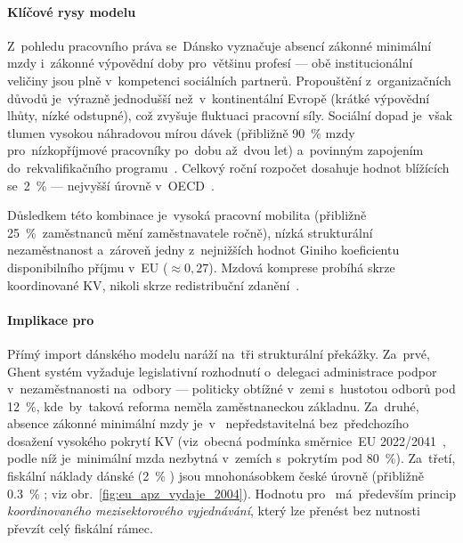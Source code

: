 \paragraph{Klíčové rysy modelu}\label{par:dk_rysy}

Z~pohledu pracovního práva se~Dánsko vyznačuje absencí zákonné minimální mzdy
i~zákonné výpovědní doby pro~většinu profesí --- obě institucionální veličiny
jsou plně v~kompetenci sociálních partnerů. Propouštění z~organizačních důvodů
je~výrazně jednodušší než~v~kontinentální Evropě (krátké výpovědní lhůty,
nízké odstupné), což zvyšuje fluktuaci pracovní síly. Sociální dopad je~však
tlumen vysokou náhradovou mírou dávek (přibližně \SI{90}{\percent} mzdy
pro~nízkopříjmové pracovníky po~dobu až~dvou let) a~povinným zapojením
do~rekvalifikačního programu~\cite{OECD_GoodJobsForAll_2018}\cite{Petricek_PS1_FlexicurityDK_2019}.
Celkový roční rozpočet  dosahuje hodnot blížících se~\SI{2}{\percent}
 --- nejvyšší úrovně v~\acs{OECD}~\cite{OECD_GoodJobsForAll_2018}.

Důsledkem této kombinace je~vysoká pracovní mobilita (přibližně 25~\%~zaměstnanců
mění zaměstnavatele ročně), nízká strukturální nezaměstnanost
a~zároveň jedny z~nejnižších hodnot Giniho koeficientu disponibilního příjmu
v~\acs{EU} ($\approx 0{,}27$). Mzdová komprese probíhá skrze koordinované
\acs{KV}, nikoli skrze redistribuční zdanění~\cite{Petricek_PS1_FlexicurityDK_2019}\cite{Hala_SystemySocialnihoDialogu2013}.

\paragraph{Implikace pro~}\label{par:dk_implikace}

Přímý import dánského modelu naráží na~tři strukturální překážky. Za~prvé,
\acs{Ghent} systém vyžaduje legislativní rozhodnutí o~delegaci administrace
podpor v~nezaměstnanosti na~odbory --- politicky obtížné v~zemi s~hustotou
odborů pod \SI{12}{\percent}, kde~by~taková reforma neměla zaměstnaneckou
základnu. Za~druhé, absence zákonné minimální mzdy je~v~
nepředstavitelná bez~předchozího dosažení vysokého pokrytí \acs{KV}
(viz~obecná podmínka směrnice~\acs{EU} 2022/2041~\cite{eu_directive_2022_2041},
podle níž je~minimální mzda nezbytná v~zemích s~pokrytím pod 80~\%). Za~třetí,
fiskální náklady dánské  (\SI{2}{\percent} ) jsou
mnohonásobkem české úrovně (přibližně \SI{0,3}{\percent} ; viz
obr.~\ref{fig:eu_apz_vydaje_2004}). Hodnotu pro~ má~především princip
\emph{koordinovaného mezisektorového vyjednávání}, který lze přenést bez
nutnosti převzít celý fiskální rámec.
